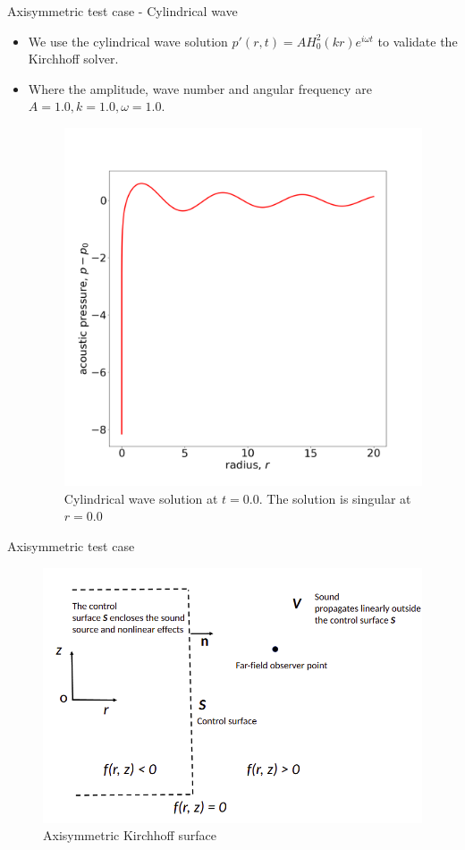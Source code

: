 \documentclass[10pt, aspectratio=169]{beamer}
\begin{document}
\begin{frame}{Axisymmetric test case - Cylindrical wave}
	\begin{itemize}
		\item We use the cylindrical wave solution $p'(r, t) = AH_{0}^2(kr)e^{i\omega t}$ to validate the Kirchhoff solver.
		\item Where the amplitude, wave number and angular frequency are $A = 1.0, k = 1.0, \omega = 1.0$.
		\begin{figure}
			\centering
			\includegraphics[scale=0.15]{images/cylindrical.png}
			\caption{Cylindrical wave solution at $t = 0.0$. The solution is singular at $r = 0.0$}
		\end{figure}
	\end{itemize}
\end{frame}

\begin{frame}{Axisymmetric test case}
	\begin{figure}
		\centering
		\includegraphics[scale=0.3]{images/shematic2.png}
		\caption{Axisymmetric Kirchhoff surface}
	\end{figure}

\end{frame}
\end{document}
